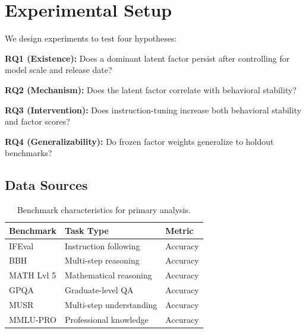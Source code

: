 \section{Experimental Setup}

We design experiments to test four hypotheses:

\textbf{RQ1 (Existence):} Does a dominant latent factor persist after controlling for model scale and release date?

\textbf{RQ2 (Mechanism):} Does the latent factor correlate with behavioral stability?

\textbf{RQ3 (Intervention):} Does instruction-tuning increase both behavioral stability and factor scores?

\textbf{RQ4 (Generalizability):} Do frozen factor weights generalize to holdout benchmarks?

\subsection{Data Sources}

\begin{table}[h]
\centering
\caption{Benchmark characteristics for primary analysis.}
\label{tab:benchmarks}
\begin{tabular}{@{}lll@{}}
\toprule
Benchmark & Task Type & Metric \\
\midrule
IFEval & Instruction following & Accuracy \\
BBH & Multi-step reasoning & Accuracy \\
MATH Lvl 5 & Mathematical reasoning & Accuracy \\
GPQA & Graduate-level QA & Accuracy \\
MUSR & Multi-step understanding & Accuracy \\
MMLU-PRO & Professional knowledge & Accuracy \\
\bottomrule
\end{tabular}
\end{table}
